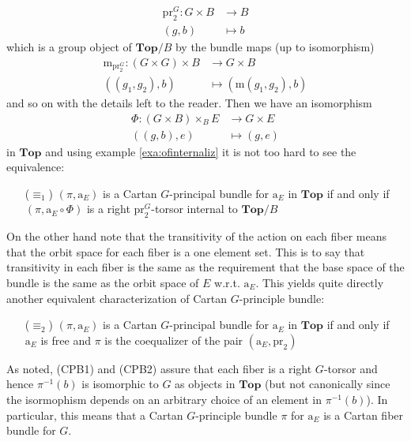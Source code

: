 \begin{exa}[Bundles 2]
\begin{align*}
  \mathrm{pr}_{2}^{G}
  \colon
  G
  \times
  B
  &\rightarrow
  B
  \\
  (g,b)
  &\mapsto
  b
\end{align*}
which is a group object of $\mathbf{Top} \slash B$ by the bundle maps (up to isomorphism)
\begin{align*}
  \mathrm{m}_{\mathrm{pr}_{2}^{G}}
  \colon
  \left(
    G
    \times
    G
  \right)
  \times
  B
  &\rightarrow
  G
  \times
  B
  \\
  ((g_{1},g_{2}),b)
  &\mapsto
  \left(
    \mathrm{m}(g_{1},g_{2}),
    b
  \right)
\end{align*}
and so on with the details left to the reader. Then we have an isomorphism
\begin{align*}
  \Phi
  \colon
  \left(
    G
    \times
    B
  \right)
  \times_{B}
  E
  &\rightarrow
  G
  \times
  E
  \\
  ((g,b),e)
  &\mapsto
  (g,e)
\end{align*}
in $\mathbf{Top}$ and using example \ref{exa:ofinternaliz} it is not too hard to see the equivalence:
\begin{enumerate}
\item[($\equiv_{1}$)]
$(\pi,\mathrm{a}_{E})$ is a Cartan $G$-principal bundle for $\mathrm{a}_{E}$ in $\mathbf{Top}$ if and only if $(\pi,\mathrm{a}_{E} \circ \Phi)$ is a right $\mathrm{pr}_{2}^{G}$-torsor internal to $\mathbf{Top} \slash B$
\end{enumerate}
On the other hand note that the transitivity of the action on each fiber means that the orbit space for each fiber is a one element set. This is to say that transitivity in each fiber is the same as the requirement that the base space of the bundle is the same as the orbit space of $E$ w.r.t. $\mathrm{a}_{E}$. This yields quite directly another equivalent characterization of Cartan $G$-principle bundle:
\begin{enumerate}
\item[($\equiv_{2}$)]
$(\pi,\mathrm{a}_{E})$ is a Cartan $G$-principal bundle for $\mathrm{a}_{E}$ in $\mathbf{Top}$ if and only if $\mathrm{a}_{E}$ is free and $\pi$ is the coequalizer of the pair $(\mathrm{a}_{E},\mathrm{pr}_{2})$
\end{enumerate}
As noted, (CPB1) and (CPB2) assure that each fiber is a right $G$-torsor and hence $\pi^{-1}(b)$ is isomorphic to $G$ as objects in $\mathbf{Top}$ (but not canonically since the isormophism depends on an arbitrary choice of an element in $\pi^{-1}(b)$). In particular, this means that a Cartan $G$-principle bundle $\pi$ for $\mathrm{a}_{E}$ is a Cartan fiber bundle for $G$.

\end{exa}
